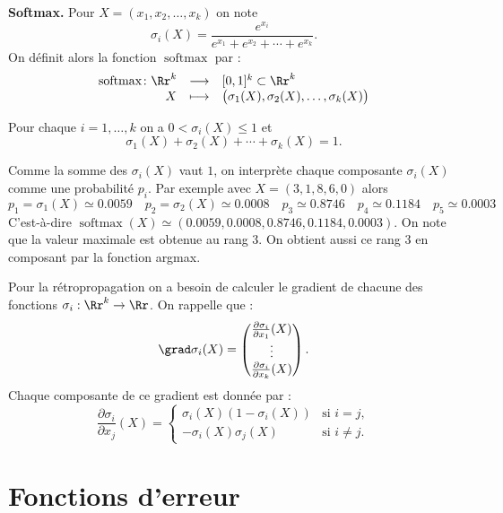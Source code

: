 \documentclass[11pt,class=report,crop=false]{standalone}
\begin{document}
\textbf{Softmax.}
Pour $X = (x_1,x_2,\ldots,x_k)$ on note
$$\sigma_i (X) = \frac{e^{x_i}}{ e^{x_1} + e^{x_2} + \cdots + e^{x_k}}.$$
On définit alors la fonction $\operatorname{softmax}$ par :
$$\begin{array}{rcl}
\operatorname{softmax} \colon \Rr^k & \longrightarrow & [0,1]^k \subset \Rr^k \\
X &\longmapsto & \big(\sigma_1(X), \sigma_2(X), \dots, \sigma_k(X)\big)
\end{array}
$$

\begin{proposition}
Pour chaque $i=1,\ldots,k$ on a 
$0 < \sigma_i(X) \le 1$ et 
$$\sigma_1(X) + \sigma_2(X) + \cdots + \sigma_k(X) = 1.$$
\end{proposition}

Comme la somme des $\sigma_i(X)$ vaut $1$, on interprète chaque composante $\sigma_i(X)$ comme une probabilité $p_i$.
Par exemple avec $X = (3,1,8,6,0)$ alors
$$
p_1 = \sigma_1(X) \simeq 0.0059 \quad
p_2 = \sigma_2(X) \simeq 0.0008 \quad
p_3 \simeq 0.8746 \quad
p_4 \simeq 0.1184 \quad
p_5 \simeq 0.0003$$
C'est-à-dire $\operatorname{softmax}(X) \simeq ( 0.0059, 0.0008, 0.8746, 0.1184, 0.0003)$.
On note que la valeur maximale est obtenue au rang $3$. On obtient aussi ce rang $3$ en composant par la fonction argmax.

\medskip

Pour la rétropropagation on a besoin de calculer le gradient de chacune des fonctions $\sigma_i : \Rr^k \to \Rr$.
On rappelle que :
\[
\grad \sigma_i(X) = 
\begin{pmatrix} 
\frac{\partial \sigma_i}{\partial x_1}(X) \\ 
\vdots \\ 
\frac{\partial \sigma_i}{\partial x_k}(X)
\end{pmatrix}.
\]
Chaque composante de ce gradient est donnée par :
\[
\frac{\partial \sigma_i}{\partial x_j}(X) =
\begin{cases}
	\sigma_i(X)(1 - \sigma_i(X)) & \text{si } i = j, \\
	- \sigma_i(X) \sigma_j(X) & \text{si } i \ne j.
\end{cases}
\]



\section{Fonctions d'erreur}
\end{document}
